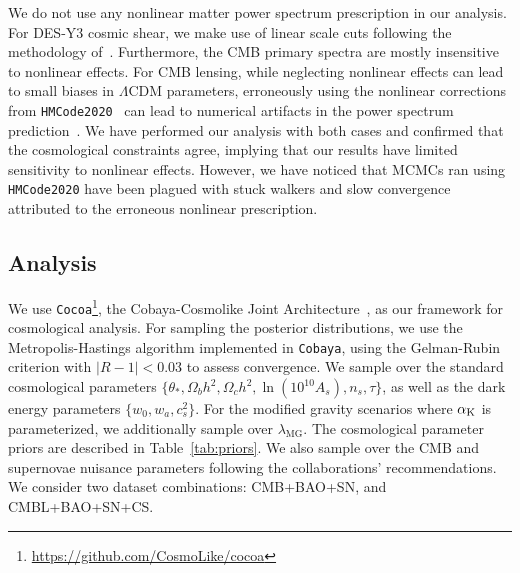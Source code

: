 \documentclass[%
reprint,
superscriptaddress,
preprint numbers,
nofootinbib,
amsmath,amssymb,
aps,
prd
]{revtex4-2}
\begin{document}
We do not use any nonlinear matter power spectrum prescription in our analysis. For DES-Y3 cosmic shear, we make use of linear scale cuts following the methodology of~\cite{planck_2015_extensions, des_y3_extensions}. Furthermore, the CMB primary spectra are mostly insensitive to nonlinear effects. For CMB lensing, while neglecting nonlinear effects can lead to small biases in $\Lambda$CDM parameters, erroneously using the nonlinear corrections from \texttt{HMCode2020}~\cite{hmcode2020} can lead to numerical artifacts in the power spectrum prediction~\cite{cmb_pheno_hard}. We have performed our analysis with both cases and confirmed that the cosmological constraints agree, implying that our results have limited sensitivity to nonlinear effects. However, we have noticed that MCMCs ran using \texttt{HMCode2020} have been plagued with stuck walkers and slow convergence attributed to the erroneous nonlinear prescription.

\subsection{Analysis}

We use \texttt{Cocoa}\footnote{\url{https://github.com/CosmoLike/cocoa}}, the Cobaya-Cosmolike Joint Architecture~\cite{cosmolike}, as our framework for cosmological analysis. For sampling the posterior distributions, we use the Metropolis-Hastings algorithm implemented in \texttt{Cobaya}, using the Gelman-Rubin criterion with $|R-1| < 0.03$ to assess convergence. We sample over the standard cosmological parameters $\{\theta_*, \Omega_b h^2, \Omega_c h^2,\ln(10^{10}A_s), n_s, \tau\}$, as well as the dark energy parameters $\{w_0, w_a, c_s^2 \}$. For the modified gravity scenarios where $\alpha_{\rm K}$ is parameterized, we additionally sample over $\lambda_\mathrm{MG}$. The cosmological parameter priors are described in Table~\ref{tab:priors}. We also sample over the CMB and supernovae nuisance parameters following the collaborations' recommendations. We consider two dataset combinations: CMB+BAO+SN, and CMBL+BAO+SN+CS.
\end{document}
